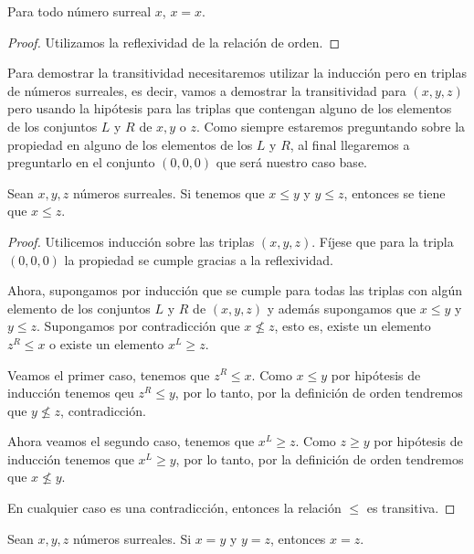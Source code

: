     \begin{corollary}
        Para todo n\'umero surreal $x$, $x = x$.
    \end{corollary}

    \begin{proof}
        Utilizamos la reflexividad de la relaci\'on de orden.
    \end{proof}

    Para demostrar la transitividad necesitaremos utilizar la inducci\'on pero en triplas de n\'umeros surreales, es decir, vamos a demostrar la transitividad para $(x,y,z)$ pero usando la hip\'otesis para las triplas que contengan alguno de los elementos de los conjuntos $L$ y $R$ de $x,y$ o $z$. Como siempre estaremos preguntando sobre la propiedad en alguno de los elementos de los $L$ y $R$, al final llegaremos a preguntarlo en el conjunto $(0,0,0)$ que ser\'a nuestro caso base.

    \begin{theorem}[Transitividad]
        Sean $x,y,z$ n\'umeros surreales. Si tenemos que $x\le y$ y $y\le z$, entonces se tiene que $x\le z$.
    \end{theorem}

    \begin{proof}
        Utilicemos inducci\'on sobre las triplas $(x,y,z)$. F\'ijese que para la tripla $(0,0,0)$ la propiedad se cumple gracias a la reflexividad.

        Ahora, supongamos por inducci\'on que se cumple para todas las triplas con alg\'un elemento de los conjuntos $L$ y $R$ de $(x,y,z)$ y adem\'as supongamos que $x\le y$ y $y\le z$. Supongamos por contradicci\'on que $x\not\le z$, esto es, existe un elemento $z^R \le x$ o existe un elemento $x^L \ge z$.

        Veamos el primer caso, tenemos que $z^R \le x$. Como $x \le y$ por hip\'otesis de inducci\'on tenemos qeu $z^R \le y$, por lo tanto, por la definici\'on de orden tendremos que $y \not\le z$, contradicci\'on.

        Ahora veamos el segundo caso, tenemos que $x^L \ge z$. Como $z \ge y$ por hip\'otesis de inducci\'on tenemos que $x^L \ge y$, por lo tanto, por la definici\'on de orden tendremos que $x\not\le y$.

        En cualquier caso es una contradicci\'on, entonces la relaci\'on $\le$ es transitiva.
    \end{proof}

    \begin{corollary}
        Sean $x,y,z$ n\'umeros surreales. Si $x = y$ y $y = z$, entonces $x = z$.
    \end{corollary}

